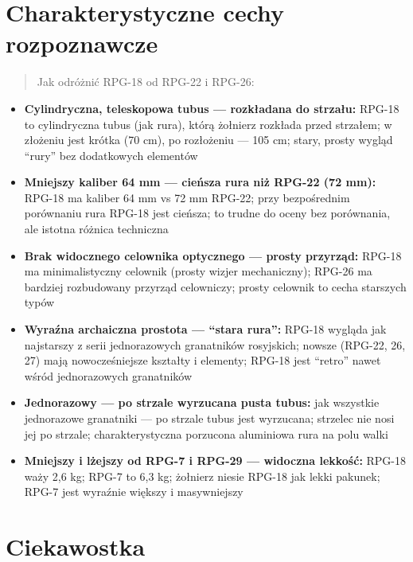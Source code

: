 \documentclass[12pt,openany,oneside]{book}
\providecommand{\tightlist}{%
  \setlength{\itemsep}{0pt}\setlength{\parskip}{0pt}}
\begin{document}
\section{Charakterystyczne cechy
rozpoznawcze}\label{charakterystyczne-cechy-rozpoznawcze-69}

\begin{quote}
Jak odróżnić RPG-18 od RPG-22 i RPG-26:
\end{quote}

\begin{itemize}
\tightlist
\item
  \textbf{Cylindryczna, teleskopowa tubus --- rozkładana do strzału:}
  RPG-18 to cylindryczna tubus (jak rura), którą żołnierz rozkłada przed
  strzałem; w złożeniu jest krótka (70 cm), po rozłożeniu --- 105 cm;
  stary, prosty wygląd ``rury'' bez dodatkowych elementów
\item
  \textbf{Mniejszy kaliber 64 mm --- cieńsza rura niż RPG-22 (72 mm):}
  RPG-18 ma kaliber 64 mm vs 72 mm RPG-22; przy bezpośrednim porównaniu
  rura RPG-18 jest cieńsza; to trudne do oceny bez porównania, ale
  istotna różnica techniczna
\item
  \textbf{Brak widocznego celownika optycznego --- prosty przyrząd:}
  RPG-18 ma minimalistyczny celownik (prosty wizjer mechaniczny); RPG-26
  ma bardziej rozbudowany przyrząd celowniczy; prosty celownik to cecha
  starszych typów
\item
  \textbf{Wyraźna archaiczna prostota --- ``stara rura'':} RPG-18
  wygląda jak najstarszy z serii jednorazowych granatników rosyjskich;
  nowsze (RPG-22, 26, 27) mają nowocześniejsze kształty i elementy;
  RPG-18 jest ``retro'' nawet wśród jednorazowych granatników
\item
  \textbf{Jednorazowy --- po strzale wyrzucana pusta tubus:} jak
  wszystkie jednorazowe granatniki --- po strzale tubus jest wyrzucana;
  strzelec nie nosi jej po strzale; charakterystyczna porzucona
  aluminiowa rura na polu walki
\item
  \textbf{Mniejszy i lżejszy od RPG-7 i RPG-29 --- widoczna lekkość:}
  RPG-18 waży 2,6 kg; RPG-7 to 6,3 kg; żołnierz niesie RPG-18 jak lekki
  pakunek; RPG-7 jest wyraźnie większy i masywniejszy
\end{itemize}

\section{Ciekawostka}\label{ciekawostka-69}
\end{document}

